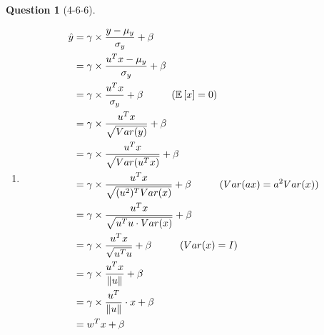 \documentclass[12pt]{article}
\theoremstyle{definition}
\newtheorem{exercise}{Question}%
\newcommand\tab[1][1cm]{\hspace*{#1}}
\newcommand{\expected}[1]{\mathbb{E}\left[ #1 \right]}
\newcommand{\norm}[1]{\|#1\|}
\begin{document}
\begin{exercise}[4-6-6]
{\begin{enumerate}
{\begin{align*}
    \\
    &= \begin{bmatrix}\begin{bmatrix}2 \\ 2 \end{bmatrix}\begin{bmatrix}2.6667 \\ 3.333 \end{bmatrix}\begin{bmatrix}2.6667 \\ 2.333 \end{bmatrix}\begin{bmatrix}2.66667 \\ 2.66667 \end{bmatrix}\end{bmatrix}
    \\
    \sigma^2_{layer} &= \frac{1}{C \times F} \sum_{i=1}^C \sum_{j=1}^F (x_{ij} - \mu)^2
    \\
    &=\begin{bmatrix}\begin{bmatrix}0.6667 \\ 0.6667 \end{bmatrix}\begin{bmatrix}0.2222 \\ 0.8889 \end{bmatrix}\begin{bmatrix}0.8889 \\ 1.5556 \end{bmatrix}\begin{bmatrix}0.2222 \\ 0.2222 \end{bmatrix}\end{bmatrix}
    \end{align*}
    }
    
    \item {
    \begin{alignat*}{3}
    \hat{y} &= \gamma \times \frac{y - \mu_y}{\sigma_y} + \beta
    \\
    &= \gamma \times \frac{u^Tx - \mu_y}{\sigma_y} + \beta
    \\
    &= \gamma \times \frac{u^Tx}{\sigma_y} + \beta \tab (\expected{x} = 0)
    \\
    &= \gamma \times \frac{u^Tx}{\sqrt{Var(y)}} + \beta
    \\
    &= \gamma \times \frac{u^Tx}{\sqrt{Var(u^Tx)}} + \beta
    \\
    &= \gamma \times \frac{u^Tx}{\sqrt{(u^{2})^T Var(x)}} + \beta \tab (Var(ax) = a^2Var(x))
    \\
    &= \gamma \times \frac{u^Tx}{\sqrt{u^Tu \cdot Var(x)}} + \beta
    \\
    &= \gamma \times \frac{u^Tx}{\sqrt{u^Tu}} + \beta \tab (Var(x) = I)
    \\
    &= \gamma \times \frac{u^Tx}{\norm{u}} + \beta
    \\
    &= \gamma \times \frac{u^T}{\norm{u}} \cdot x + \beta
    \\
    &= w^T x + \beta
    \end{alignat*}
    
}
\end{enumerate}}
\end{exercise}
\end{document}
